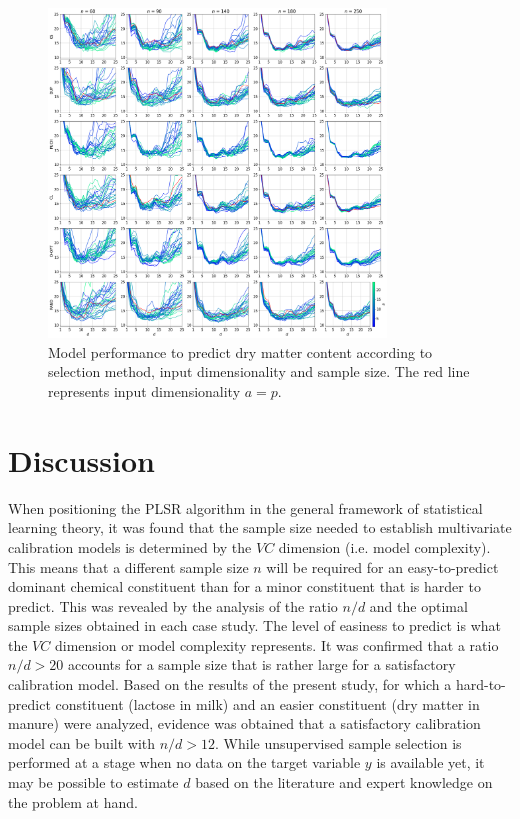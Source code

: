 \documentclass[journal=ancham,manuscript=article]{achemso}
\begin{document}
\begin{figure}[b]
\includegraphics[width=0.8\textwidth]{manuscript/figures/d02_manure_model_performance.png}
\centering
\caption{Model performance to predict dry matter content according to selection method, input dimensionality and sample size. The red line represents input dimensionality $a=p$.}
\label{fig_d02_manure_model_performance}
\end{figure}




\section*{Discussion}\label{discussion}

When positioning the PLSR algorithm in the general framework of statistical learning theory, it was found that the sample size needed to establish multivariate calibration models is determined by the $VC$ dimension (i.e. model complexity). This means that a different sample size $n$ will be required for an easy-to-predict dominant chemical constituent than for a minor constituent that is harder to predict. This was revealed by the analysis of the ratio $n/d$ and the optimal sample sizes obtained in each case study. The level of easiness to predict is what the $VC$ dimension or model complexity represents. It was confirmed that a ratio $n/d>20$ accounts for a sample size that is rather large for a satisfactory calibration model. Based on the results of the present study, for which a hard-to-predict constituent (lactose in milk) and an easier constituent (dry matter in manure) were analyzed, evidence was obtained that a satisfactory calibration model can be built with $n/d>12$. While unsupervised sample selection is performed at a stage when no data on the target variable $y$ is available yet, it may be possible to estimate $d$ based on the literature and expert knowledge on the problem at hand.
\end{document}
